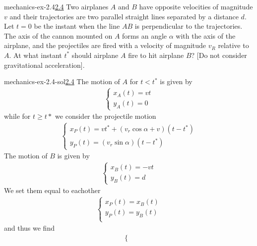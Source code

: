 \documentclass[preview]{standalone}
\begin{document}
\begin{snippetexercise}{mechanics-ex-2.4}{\underline{2.4}}
    Two airplanes \(A\) and \(B\) have opposite velocities of magnitude \(v\) and their trajectories are two
    parallel straight lines separated by a distance \(d\).
    Let \(t=0\) be the instant when the line \(AB\) is perpendicular to the trajectories.
    The axis of the cannon mounted on \(A\) forms an angle \(\alpha\) with the axis of the airplane,
    and the projectiles are fired with a velocity of magnitude \(v_R\) relative to \(A\).
    At what instant \(t^*\) should airplane \(A\) fire to hit airplane \(B\)?
    [Do not consider gravitational acceleration].
\end{snippetexercise}

\begin{snippetsolution}{mechanics-ex-2.4-sol}{\underline{2.4}}
    The motion of \(A\) for \(t < t^*\) is given by
    \begin{align*}
        \begin{cases}
            x_A(t) = vt \\
            y_A(t) = 0
        \end{cases}
    \end{align*}
    while for \(t \geq t*\) we consider the projectile motion
    \begin{align*}
        \begin{cases}
            x_P(t) = vt^* + (v_r \cos \alpha + v)(t - t^*) \\
            y_P(t) = (v_r \sin \alpha)(t - t^*)
        \end{cases}
    \end{align*}
    The motion of \(B\) is given by
    \begin{align*}
        \begin{cases}
            x_B(t) = -vt \\
            y_B(t) = d
        \end{cases}
    \end{align*}
    We set them equal to eachother
    \begin{align*}
        \begin{cases}
            x_P(t) = x_B(t) \\
            y_P(t) = y_B(t) \\
        \end{cases}
    \end{align*}
    and thus we find
    \begin{align*}
        \begin{cases}

\end{cases}
\end{align*}
\end{snippetsolution}
\end{document}

